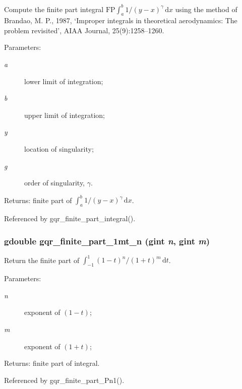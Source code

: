 Compute the finite part integral $\mathrm{FP}\int_{a}^{b}1/(y-x)^{\gamma}\,\mathrm{d}x$ using the method of Brandao, M. P., 1987, `Improper integrals in theoretical aerodynamics: The problem revisited', AIAA Journal, 25(9):1258--1260.

\begin{Desc}
\item[Parameters:]
\begin{description}
\item[{\em a}]lower limit of integration; \item[{\em b}]upper limit of integration; \item[{\em y}]location of singularity; \item[{\em g}]order of singularity, $\gamma$.\end{description}
\end{Desc}
\begin{Desc}
\item[Returns:]finite part of $\int_{a}^{b}1/(y-x)^{\gamma}\,\mathrm{d}x$. \end{Desc}


Referenced by gqr\_\-finite\_\-part\_\-integral().
\subsubsection{\setlength{\rightskip}{0pt plus 5cm}gdouble gqr\_\-finite\_\-part\_\-1mt\_\-n (gint {\em n}, \/  gint {\em m})}\label{fpart_8c_f599fd6c488ff6d9e2959ddf585265a4}


Return the finite part of $\int_{-1}^{1}(1-t)^n/(1+t)^m\,\mathrm{d}t$.

\begin{Desc}
\item[Parameters:]
\begin{description}
\item[{\em n}]exponent of $(1-t)$; \item[{\em m}]exponent of $(1+t)$;\end{description}
\end{Desc}
\begin{Desc}
\item[Returns:]finite part of integral. \end{Desc}


Referenced by gqr\_\-finite\_\-part\_\-Pn1().
